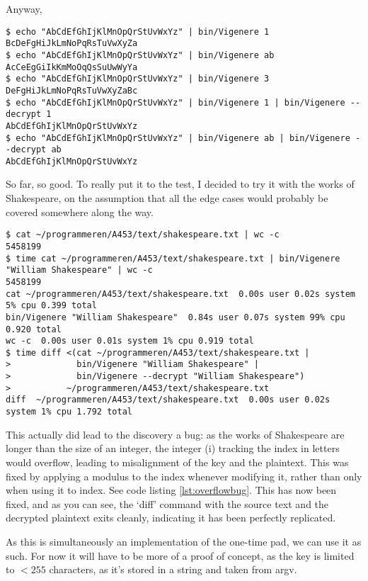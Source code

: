 \documentclass[fleqn,a4paper,11pt]{article}
\begin{document}
    Anyway,

\begin{lstlisting}[caption=Testing bin/Vigenere]
$ echo "AbCdEfGhIjKlMnOpQrStUvWxYz" | bin/Vigenere 1
BcDeFgHiJkLmNoPqRsTuVwXyZa
$ echo "AbCdEfGhIjKlMnOpQrStUvWxYz" | bin/Vigenere ab
AcCeEgGiIkKmMoOqQsSuUwWyYa
$ echo "AbCdEfGhIjKlMnOpQrStUvWxYz" | bin/Vigenere 3
DeFgHiJkLmNoPqRsTuVwXyZaBc
$ echo "AbCdEfGhIjKlMnOpQrStUvWxYz" | bin/Vigenere 1 | bin/Vigenere --decrypt 1
AbCdEfGhIjKlMnOpQrStUvWxYz
$ echo "AbCdEfGhIjKlMnOpQrStUvWxYz" | bin/Vigenere ab | bin/Vigenere --decrypt ab
AbCdEfGhIjKlMnOpQrStUvWxYz
\end{lstlisting}
\iffalse $ \fi %

    So far, so good. To really put it to the test, I decided to try it with the
    works of Shakespeare, on the assumption that all the edge cases would
    probably be covered somewhere along the way.

\begin{lstlisting}[caption=Shakespeare]
$ cat ~/programmeren/A453/text/shakespeare.txt | wc -c
5458199
$ time cat ~/programmeren/A453/text/shakespeare.txt | bin/Vigenere "William Shakespeare" | wc -c
5458199
cat ~/programmeren/A453/text/shakespeare.txt  0.00s user 0.02s system 5% cpu 0.399 total
bin/Vigenere "William Shakespeare"  0.84s user 0.07s system 99% cpu 0.920 total
wc -c  0.00s user 0.01s system 1% cpu 0.919 total
$ time diff <(cat ~/programmeren/A453/text/shakespeare.txt |
>             bin/Vigenere "William Shakespeare" |
>             bin/Vigenere --decrypt "William Shakespeare")
>           ~/programmeren/A453/text/shakespeare.txt
diff  ~/programmeren/A453/text/shakespeare.txt  0.00s user 0.02s system 1% cpu 1.792 total
\end{lstlisting}
\iffalse $ \fi %

    This actually did lead to the discovery a bug: as the works of Shakespeare
    are longer than the size of an integer, the integer (i) tracking the index
    in letters would overflow, leading to misalignment of the key and the
    plaintext. This was fixed by applying a modulus to the index whenever
    modifying it, rather than only when using it to index. See code listing
    \ref{lst:overflowbug}. This has now been fixed, and as you can see, the
    `diff' command with the source text and the decrypted plaintext exits
    cleanly, indicating it has been perfectly replicated.

    As this is simultaneously an implementation of the one-time pad, we can use
    it as such. For now it will have to be more of a proof of concept, as the
    key is limited to \(< 255\) characters, as it's stored in a string and taken
    from argv.
\end{document}
